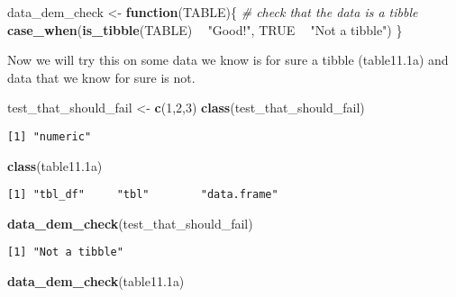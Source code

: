 \documentclass[
]{article}
\newenvironment{Shaded}{\begin{snugshade}}{\end{snugshade}}
\newcommand{\CommentTok}[1]{\textcolor[rgb]{0.56,0.35,0.01}{\textit{#1}}}
\newcommand{\ControlFlowTok}[1]{\textcolor[rgb]{0.13,0.29,0.53}{\textbf{#1}}}
\newcommand{\DecValTok}[1]{\textcolor[rgb]{0.00,0.00,0.81}{#1}}
\newcommand{\FloatTok}[1]{\textcolor[rgb]{0.00,0.00,0.81}{#1}}
\newcommand{\KeywordTok}[1]{\textcolor[rgb]{0.13,0.29,0.53}{\textbf{#1}}}
\newcommand{\NormalTok}[1]{#1}
\newcommand{\OperatorTok}[1]{\textcolor[rgb]{0.81,0.36,0.00}{\textbf{#1}}}
\newcommand{\OtherTok}[1]{\textcolor[rgb]{0.56,0.35,0.01}{#1}}
\newcommand{\StringTok}[1]{\textcolor[rgb]{0.31,0.60,0.02}{#1}}
\begin{document}
\begin{Shaded}
\begin{Highlighting}[]
\NormalTok{data_dem_check <-}\StringTok{ }\ControlFlowTok{function}\NormalTok{(TABLE)\{}
  \CommentTok{# check that the data is a tibble}
  \KeywordTok{case_when}\NormalTok{(}\KeywordTok{is_tibble}\NormalTok{(TABLE) }\OperatorTok{~}\StringTok{ "Good!"}\NormalTok{,}
                        \OtherTok{TRUE} \OperatorTok{~}\StringTok{ "Not a tibble"}\NormalTok{)}
\NormalTok{\}}
\end{Highlighting}
\end{Shaded}

Now we will try this on some data we know is for sure a tibble
(table11.1a) and data that we know for sure is not.

\begin{Shaded}
\begin{Highlighting}[]
\NormalTok{test_that_should_fail <-}\StringTok{ }\KeywordTok{c}\NormalTok{(}\DecValTok{1}\NormalTok{,}\DecValTok{2}\NormalTok{,}\DecValTok{3}\NormalTok{)}
\KeywordTok{class}\NormalTok{(test_that_should_fail)}
\end{Highlighting}
\end{Shaded}

\begin{verbatim}
[1] "numeric"
\end{verbatim}

\begin{Shaded}
\begin{Highlighting}[]
\KeywordTok{class}\NormalTok{(table11}\FloatTok{.1}\NormalTok{a)}
\end{Highlighting}
\end{Shaded}

\begin{verbatim}
[1] "tbl_df"     "tbl"        "data.frame"
\end{verbatim}

\begin{Shaded}
\begin{Highlighting}[]
\KeywordTok{data_dem_check}\NormalTok{(test_that_should_fail)}
\end{Highlighting}
\end{Shaded}

\begin{verbatim}
[1] "Not a tibble"
\end{verbatim}

\begin{Shaded}
\begin{Highlighting}[]
\KeywordTok{data_dem_check}\NormalTok{(table11}\FloatTok{.1}\NormalTok{a)}
\end{Highlighting}
\end{Shaded}
\end{document}
